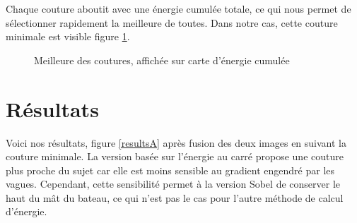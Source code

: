 \documentclass[a4paper]{article}
\begin{document}
Chaque couture aboutit avec une énergie cumulée totale, ce qui nous permet de sélectionner rapidement la
meilleure de toutes. Dans notre cas, cette couture minimale est visible figure \ref{bestseam}.

\begin{figure}[!ht]%
    \centering
    \hspace{0.030\textwidth}
    \caption{Meilleure des coutures, affichée sur carte d'énergie cumulée}
    \label{bestseam}
\end{figure}
\section{Résultats}



Voici nos résultats, figure \ref{resultsA} après fusion des deux images en suivant la couture minimale. La
version basée sur l'énergie au carré propose une couture plus proche du sujet car elle est moins sensible au gradient engendré par les vagues.
Cependant, cette sensibilité permet à la version Sobel de conserver le haut du mât du bateau, ce qui n'est pas le cas pour l'autre méthode de calcul d'énergie.
\end{document}
